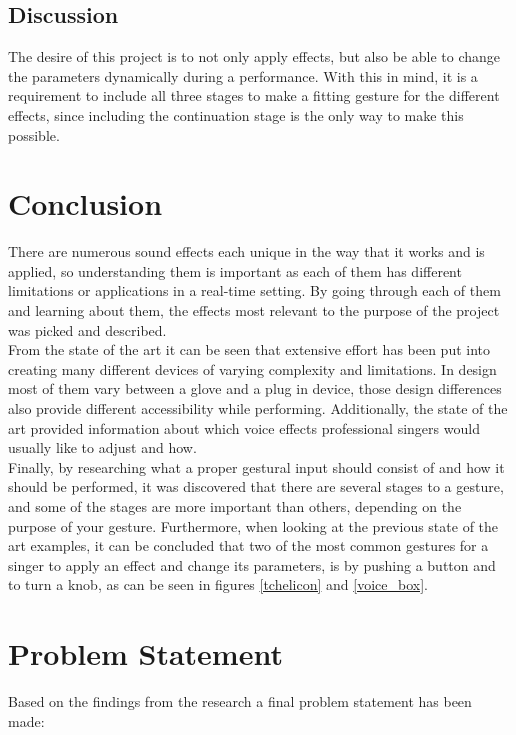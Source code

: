 \subsection{Discussion}

The desire of this project is to not only apply effects, but also be able to change the parameters dynamically during a performance. With this in mind, it is a requirement to include all three stages to make a fitting gesture for the different effects, since including the continuation stage is the only way to make this possible.


\section{Conclusion}

There are numerous sound effects each unique in the way that it works and is applied, so understanding them is important as each of them has different limitations or applications in a real-time setting.
By going through each of them and learning about them, the effects most relevant to the purpose of the project was picked and described.\\

From the state of the art it can be seen that extensive effort has been put into creating many different devices of varying complexity and limitations. In design most of them vary between a glove and a plug in device, those design differences also provide different accessibility while performing.
Additionally, the state of the art provided information about which voice effects professional singers would usually like to adjust and how.\\

Finally, by researching what a proper gestural input should consist of and how it should be performed, it was discovered that there are several stages to a gesture, and some of the stages are more important than others, depending on the purpose of your gesture.
Furthermore, when looking at the previous state of the art examples, it can be concluded that two of the most common gestures for a singer to apply an effect and change its parameters, is by pushing a button and to turn a knob, as can be seen in figures \ref{tchelicon} and \ref{voice_box}.

\section{Problem Statement}

Based on the findings from the research a final problem statement has been made:\\

